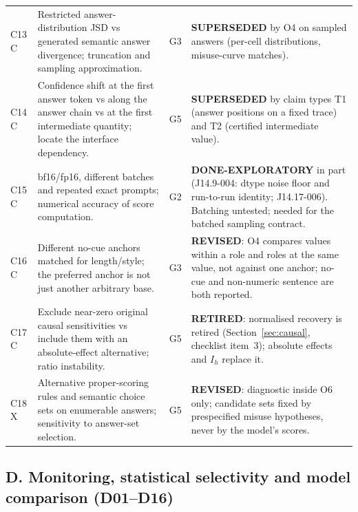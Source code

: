 \documentclass[10pt,a4paper]{article}
\begin{document}
\begin{longtable}{@{}P{1.2cm}P{7.2cm}P{1.3cm}P{5.6cm}@{}}
C13 \newline C & Restricted answer-distribution JSD vs generated semantic answer divergence; truncation and sampling approximation. & G3 &
\textbf{SUPERSEDED} by O4 on sampled answers (per-cell distributions, misuse-curve matches). \\
C14 \newline C & Confidence shift at the first answer token vs along the answer chain vs at the first intermediate quantity; locate the interface dependency. & G5 &
\textbf{SUPERSEDED} by claim types T1 (answer positions on a fixed trace) and T2 (certified intermediate value). \\
C15 \newline C & bf16/fp16, different batches and repeated exact prompts; numerical accuracy of score computation. & G2 &
\textbf{DONE-EXPLORATORY} in part (J14.9-004: dtype noise floor and run-to-run identity; J14.17-006). Batching untested; needed for the batched sampling contract. \\
C16 \newline C & Different no-cue anchors matched for length/style; the preferred anchor is not just another arbitrary base. & G3 &
\textbf{REVISED}: O4 compares values within a role and roles at the same value, not against one anchor; no-cue and non-numeric sentence are both reported. \\
C17 \newline C & Exclude near-zero original causal sensitivities vs include them with an absolute-effect alternative; ratio instability. & G5 &
\textbf{RETIRED}: normalised recovery is retired (Section~\ref{sec:causal}, checklist item~3); absolute effects and $I_h$ replace it. \\
C18 \newline X & Alternative proper-scoring rules and semantic choice sets on enumerable answers; sensitivity to answer-set selection. & G5 &
\textbf{REVISED}: diagnostic inside O6 only; candidate sets fixed by prespecified misuse hypotheses, never by the model's scores. \\
\end{longtable}
\endgroup

\subsection{D. Monitoring, statistical selectivity and model comparison (D01--D16)}
\label{sec:inv-D}
\end{document}
